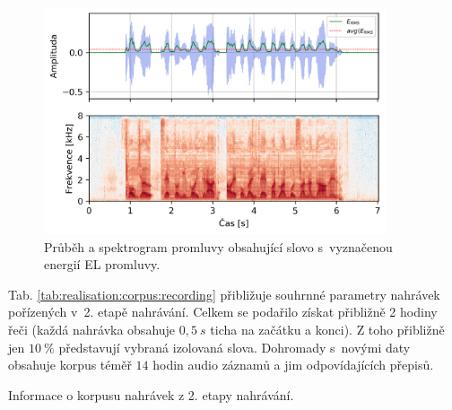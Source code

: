 \begin{figure}[hbpt]
  \centering
  \includegraphics[width=0.9\textwidth]{./ch5-construction/img/energy_spec_sentence.png}
  \caption[Průběh a spektrogram promluvy obsahující slovo .]{Průběh a spektrogram promluvy obsahující slovo  s~vyznačenou energií EL promluvy.}
  \label{fig:realisation:corpus:sentence}
\end{figure}

Tab. \ref{tab:realisation:corpus:recording} přibližuje souhrnné parametry nahrávek pořízených v~2. etapě nahrávání.
Celkem se podařilo získat přibližně 2 hodiny řeči (každá nahrávka obsahuje $0,5\ s$ ticha na začátku a konci).
Z toho přibližně jen $10\ \%$ představují vybraná izolovaná slova.
Dohromady s~novými daty obsahuje korpus téměř $14$ hodin audio záznamů a jim odpovídajících přepisů.

\begin{table}[htpb]
  \centering
  \def\arraystretch{1.5}
  \caption{Informace o korpusu nahrávek z 2. etapy nahrávání.}
  \label{tab:realisation:corpus:recording}
\end{table}

